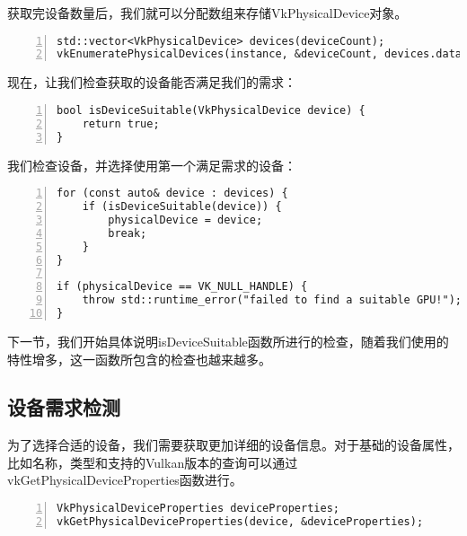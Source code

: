 \documentclass{ctexart}
\begin{document}
获取完设备数量后，我们就可以分配数组来存储VkPhysicalDevice对象。

\begin{lstlisting}[language={[ANSI]C},keywordstyle=\color{blue!70},commentstyle=\color{red!50!green!50!blue!50},frame=shadowbox, rulesepcolor=\color{red!20!green!20!blue!20},basicstyle=\small,numbers=left, numberstyle=\tiny,breaklines=true]
std::vector<VkPhysicalDevice> devices(deviceCount);
vkEnumeratePhysicalDevices(instance, &deviceCount, devices.data());
\end{lstlisting}

现在，让我们检查获取的设备能否满足我们的需求：

\begin{lstlisting}[language={[ANSI]C},keywordstyle=\color{blue!70},commentstyle=\color{red!50!green!50!blue!50},frame=shadowbox, rulesepcolor=\color{red!20!green!20!blue!20},basicstyle=\small,numbers=left, numberstyle=\tiny,breaklines=true]
bool isDeviceSuitable(VkPhysicalDevice device) {
	return true;
}
\end{lstlisting}

我们检查设备，并选择使用第一个满足需求的设备：

\begin{lstlisting}[language={[ANSI]C},keywordstyle=\color{blue!70},commentstyle=\color{red!50!green!50!blue!50},frame=shadowbox, rulesepcolor=\color{red!20!green!20!blue!20},basicstyle=\small,numbers=left, numberstyle=\tiny,breaklines=true]
for (const auto& device : devices) {
	if (isDeviceSuitable(device)) {
		physicalDevice = device;
		break;
	}
}

if (physicalDevice == VK_NULL_HANDLE) {
	throw std::runtime_error("failed to find a suitable GPU!");
}
\end{lstlisting}

下一节，我们开始具体说明isDeviceSuitable函数所进行的检查，随着我们使用的特性增多，这一函数所包含的检查也越来越多。

\subsection{设备需求检测}

为了选择合适的设备，我们需要获取更加详细的设备信息。对于基础的设备属性，比如名称，类型和支持的Vulkan版本的查询可以通过vkGetPhysicalDeviceProperties函数进行。

\begin{lstlisting}[language={[ANSI]C},keywordstyle=\color{blue!70},commentstyle=\color{red!50!green!50!blue!50},frame=shadowbox, rulesepcolor=\color{red!20!green!20!blue!20},basicstyle=\small,numbers=left, numberstyle=\tiny,breaklines=true]
VkPhysicalDeviceProperties deviceProperties;
vkGetPhysicalDeviceProperties(device, &deviceProperties);
\end{lstlisting}
\end{document}
